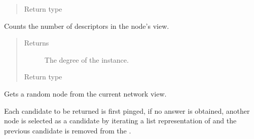 \documentclass[letterpaper,10pt,english]{sphinxmanual}
\begin{document}
\begin{fulllineitems}
\begin{fulllineitems}
\begin{quote}
\begin{description}
\item[{Return type}] \leavevmode
{}

\end{description}\end{quote}

\end{fulllineitems}


\begin{fulllineitems}
\label{\detokenize{app.domain:app.domain.network_nodes.NewscastNode.get_degree}}
Counts the number of descriptors in the node’s view.
\begin{quote}\begin{description}
\item[{Returns}] \leavevmode
The degree of the  instance.

\item[{Return type}] \leavevmode
{}

\end{description}\end{quote}

\end{fulllineitems}


\begin{fulllineitems}
\label{\detokenize{app.domain:app.domain.network_nodes.NewscastNode.get_node}}
Gets a random node from the current network view.

Each candidate {\hyperref[\detokenize{app.domain:app.domain.network_nodes.NewscastNode}]{}} to be returned is first pinged,
if no answer is obtained, another node is selected as a candidate by
iterating a list representation of {\hyperref[\detokenize{app.domain:app.domain.network_nodes.NewscastNode.view}]{}} and the previous
candidate is removed from the {\hyperref[\detokenize{app.domain:app.domain.network_nodes.NewscastNode.view}]{}}.


\end{fulllineitems}
\end{fulllineitems}
\end{document}
